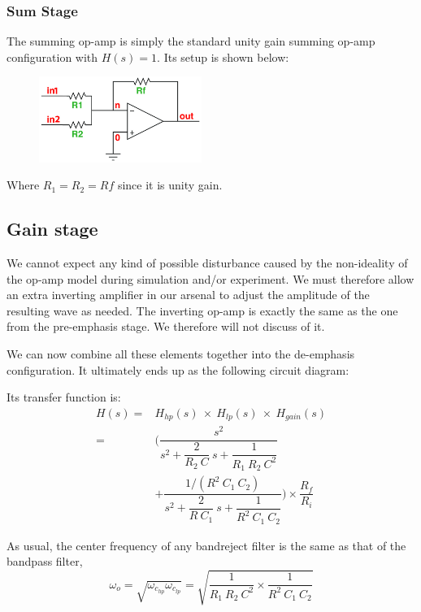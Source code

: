 \documentclass[report]{IEEEtran}
\newcommand{\inv}[1]{\dfrac{1}{#1}}
\begin{document}
			\subsubsection{Sum Stage}
				The summing op-amp is simply the standard unity gain summing op-amp configuration with $H(s)=1$. Its setup is shown below:
				\begin{figure}[h!]
					\begin{center}
						\includegraphics[width=200px]{sum.jpg}
					\end{center}
				\end{figure}
				
			Where $R_1 = R_2 = Rf$ since it is unity gain.
			
			\subsection{Gain stage}
				We cannot expect any kind of possible disturbance caused by the non-ideality of the op-amp model during simulation and/or experiment. We must therefore allow an extra inverting amplifier in our arsenal to adjust the amplitude of the resulting wave as needed. The inverting op-amp is exactly the same as the one from the pre-emphasis stage. We therefore will not discuss of it.
				
			We can now combine all these elements together into the de-emphasis configuration. It ultimately ends up as the following circuit diagram:
			
			Its transfer function is:
			\begin{align}
				H(s) = & H_{hp}(s)~\times~H_{lp}(s)~\times~H_{gain}(s) \\
				= & \Bigg( \dfrac{s^2}{s^2+\dfrac{2}{R_2~C}~s+\inv{R_1~R_2~C^2}} \\ & + \dfrac{1/(R^2~C_1~C_2)}{s^2+\dfrac{2}{R~C_1}~s+\inv{R^2~C_1~C_2}} \Bigg) \times \dfrac{R_f}{R_i}
			\end{align}
			
			As usual, the center frequency of any bandreject filter is the same as that of the bandpass filter,
			\begin{equation}
				\omega_o = \sqrt{\omega_{c_{hp}} \omega_{c_{lp}}} = \sqrt{\inv{R_1~R_2~C^2} \times \inv{R^2~C_1~C_2}}
			\end{equation}
			
\end{document}

